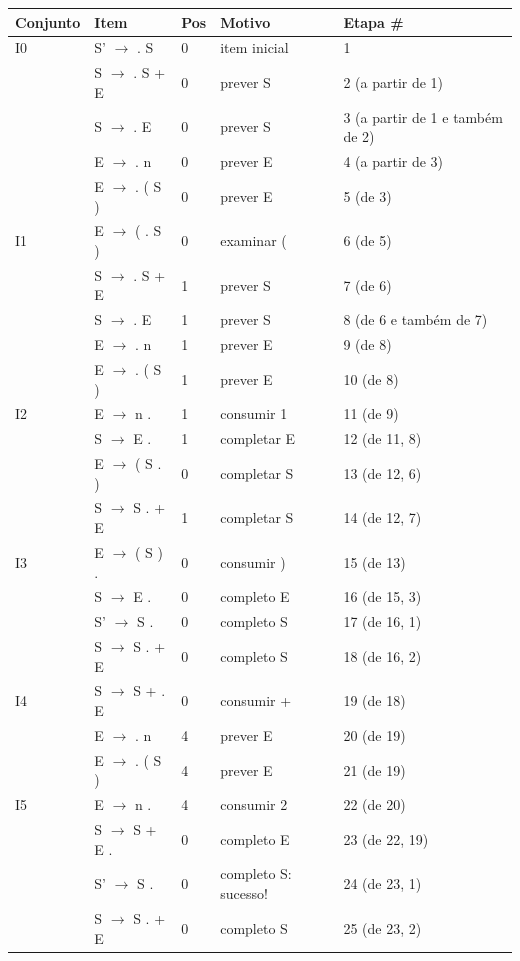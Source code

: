 \begin{table}[H]
\begin{tabular}{@{}lllll@{}}
  \toprule
  Conjunto & Item & Pos & Motivo & Etapa \# \\
  \midrule
  I0 & S' $\to$ . S & 0 & item inicial & 1 \\
  & S $\to$ . S + E & 0 & prever S & 2 (a partir de 1) \\
  & S $\to$ . E & 0 & prever S & 3 (a partir de 1 e também de 2) \\
  & E $\to$ . n & 0 & prever E & 4 (a partir de 3) \\
  & E $\to$ . ( S ) & 0 & prever E & 5 (de 3) \\
  \midrule
  I1 & E $\to$ ( . S ) & 0 & examinar ( & 6 (de 5) \\
    & S $\to$ . S + E & 1 & prever S & 7 (de 6) \\
    & S $\to$ . E & 1 & prever S & 8 (de 6 e também de 7) \\
    & E $\to$ . n & 1 & prever E & 9 (de 8) \\
    & E $\to$ . ( S ) & 1 & prever E & 10 (de 8) \\
    \midrule
    I2 & E $\to$ n . & 1 & consumir 1 & 11 (de 9) \\
    & S $\to$ E . & 1 & completar E & 12 (de 11, 8) \\
    & E $\to$ ( S . ) & 0 & completar S & 13 (de 12, 6) \\
    & S $\to$ S . + E & 1 & completar S & 14 (de 12, 7) \\
    \midrule
  I3 & E $\to$ ( S ) . & 0 & consumir ) & 15 (de 13) \\
  & S $\to$ E . & 0 & completo E & 16 (de 15, 3) \\
  & S' $\to$ S . & 0 & completo S & 17 (de 16, 1) \\
  & S $\to$ S . + E & 0 & completo S & 18 (de 16, 2) \\
  \midrule
  I4 & S $\to$ S + . E & 0 & consumir + & 19 (de 18) \\
  & E $\to$ . n & 4 & prever E & 20 (de 19) \\
  & E $\to$ . ( S ) & 4 & prever E & 21 (de 19) \\
  \midrule
  I5 & E $\to$ n . & 4 & consumir 2 & 22 (de 20) \\
  & S $\to$ S + E . & 0 & completo E & 23 (de 22, 19) \\
  & S' $\to$ S . & 0 & completo S: sucesso! & 24 (de 23, 1) \\
  & S $\to$ S . + E & 0 & completo S & 25 (de 23, 2) \\
  \bottomrule
\end{tabular}
\centering
\end{table}


